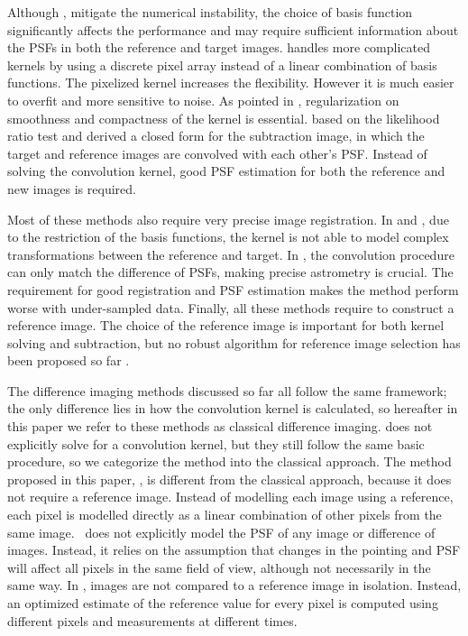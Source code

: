 Although \cite{alard}, \cite{varyingkernel} mitigate the numerical instability, the choice of basis function significantly affects the performance and may require sufficient information about the PSFs in both the reference and target images.
\cite{bramich} handles more complicated kernels by using a discrete pixel array instead of a linear combination of basis functions.
The pixelized kernel increases the flexibility. 
However it is much easier to overfit and more sensitive to noise. 
As pointed in \cite{regularization}, regularization on smoothness and compactness of the kernel is essential.  
\cite{optimal} based on the likelihood ratio test and derived a closed form for the subtraction image, in which the target and reference images are convolved with each other's PSF.
Instead of solving the convolution kernel, good PSF estimation for both the reference and new images is required.

Most of these methods also require very precise image registration. 
In \cite{alard} and \cite{varyingkernel}, due to the restriction of the basis functions, the kernel is not able to model complex transformations between the reference and target. 
In \cite{optimal}, the convolution procedure can only match the difference of PSFs, making precise astrometry is crucial.
The requirement for good registration and PSF estimation makes the method perform worse with under-sampled data.
Finally, all these methods require to construct a reference image. 
The choice of the reference image is important for both kernel solving and subtraction, but no robust algorithm for reference image selection has been proposed so far \citep{reference}.

The difference imaging methods discussed so far \citep{imagesub1, alard, varyingkernel, bramich} all follow the same framework; the only difference lies in how the convolution kernel is calculated, so hereafter in this paper we refer to these methods as classical difference imaging. 
\cite{optimal} does not explicitly solve for a convolution kernel, but they still follow the same basic procedure, so we categorize the method into the classical approach.
The method proposed in this paper, \cpmdiff, is different from the classical approach, because it does not require a reference image. 
Instead of modelling each image using a reference, each pixel is modelled directly as a linear combination of other pixels from the same image. 
\cpmdiff\ does not explicitly model the PSF of any image
or difference of images. 
Instead, it relies on the assumption that changes in the pointing and PSF will affect all pixels in the same field of view, although not necessarily in the same way. 
In \cpmdiff, images are not compared to a reference image in isolation. 
Instead, an optimized estimate of the reference value for every pixel is computed using different pixels and measurements at different times.


